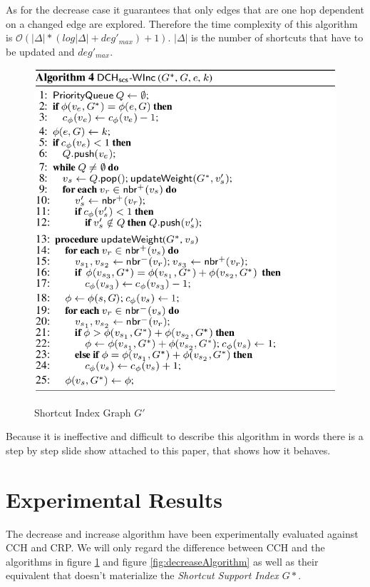 \documentclass[twocolumn]{article}
\begin{document}
As for the decrease case it guarantees that only edges that are one hop dependent on a changed edge are explored. Therefore the time complexity 
of this algorithm is $\mathcal{O}(\vert\Delta\vert  * (log \vert \Delta \vert + deg'_{max}) + 1)$.  $\vert\Delta\vert$ is the
number of shortcuts that have to be updated and $deg'_{max}$. \cite{Ouyang2020}

\begin{figure}[ht]
    \caption{Shortcut Index Graph $G'$}
    \centering
    \includegraphics[width=\linewidth]{increaseAlgorithm}
    \label{fig:increaseAlgorithm}
\end{figure}

Because it is ineffective and difficult to describe this algorithm in words there is a step by step slide show attached to this
paper, that shows how it behaves. 

\section{Experimental Results} \label{Experimental Results}

The decrease and increase algorithm have been experimentally evaluated against CCH and CRP. We will only regard the difference between 
CCH and the algorithms in figure \ref{fig:increaseAlgorithm} and figure \ref{fig:decreaseAlgorithm} as well as their equivalent
that doesn't materialize the \textit{Shortcut Support Index $G*$}.  \cite{Ouyang2020}
\end{document}
